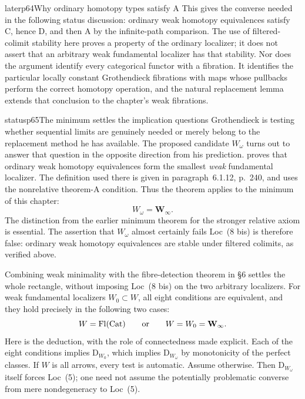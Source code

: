 \begin{dcomment}{later}{p64}{Why ordinary homotopy types satisfy A}
This gives the converse needed in the following status discussion: ordinary weak homotopy equivalences satisfy C, hence D, and then A by the infinite-path comparison. The use of filtered-colimit stability here proves a property of the ordinary localizer; it does not assert that an arbitrary weak fundamental localizer has that stability. Nor does the argument identify every categorical functor with a fibration. It identifies the particular locally constant Grothendieck fibrations with maps whose pullbacks perform the correct homotopy operation, and the natural replacement lemma extends that conclusion to the chapter's weak fibrations.
\end{dcomment}


\begin{dcomment}{status}{p65}{The minimum settles the implication questions}
Grothendieck is testing whether sequential limits are genuinely needed or merely belong to the replacement method he has available. The proposed candidate $W_\omega$ turns out to answer that question in the opposite direction from his prediction. \citet[Theorem~6.1.18, pp.~242--243]{Cisinski2006} proves that ordinary weak homotopy equivalences form the smallest \emph{weak} fundamental localizer. The definition used there is given in paragraph~6.1.12, p.~240, and uses the nonrelative theorem-A condition. Thus the theorem applies to the minimum of this chapter:
\[
 W_\omega=\mathbf W_\infty.
\]
The distinction from the earlier minimum theorem for the stronger relative axiom is essential. The assertion that $W_\omega$ almost certainly fails Loc~(8 bis) is therefore false: ordinary weak homotopy equivalences are stable under filtered colimits, as verified above.

Combining weak minimality with the fibre-detection theorem in \S6 settles the whole rectangle, without imposing Loc~(8 bis) on the two arbitrary localizers. For weak fundamental localizers $W_0\subset W$, all eight conditions are equivalent, and they hold precisely in the following two cases:
\[
 W=\mathrm{Fl}(\mathrm{Cat})
 \qquad\text{or}\qquad
 W=W_0=\mathbf W_\infty.
\]
Here is the deduction, with the role of connectedness made explicit. Each of the eight conditions implies $\mathrm D_{W_0}$, which implies $\mathrm D_{W_\omega}$ by monotonicity of the perfect classes. If $W$ is all arrows, every test is automatic. Assume otherwise. Then $\mathrm D_{W_\omega}$ itself forces Loc~(5); one need not assume the potentially problematic converse from mere nondegeneracy to Loc~(5).


\end{dcomment}
